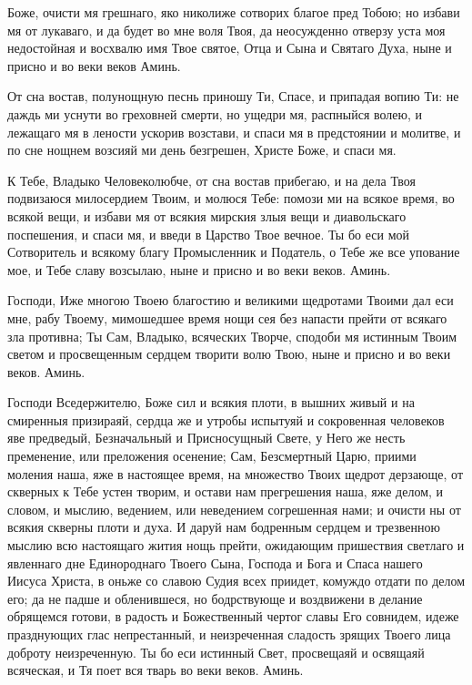 
Боже, очисти мя грешнаго, яко николиже сотворих благое пред Тобою; но избави мя от лукаваго, и да будет во мне воля Твоя, да неосужденно отверзу уста моя недостойная и восхвалю имя Твое святое, Отца и Сына и Святаго Духа, ныне и присно и во веки веков Аминь. 




От сна востав, полунощную песнь приношу Ти, Спасе, и припадая вопию Ти: не даждь ми уснути во греховней смерти, но ущедри мя, распныйся волею, и лежащаго мя в лености ускорив возстави, и спаси мя в предстоянии и молитве, и по сне нощнем возсияй ми день безгрешен, Христе Боже, и спаси мя.




К Тебе, Владыко Человеколюбче, от сна востав прибегаю, и на дела Твоя подвизаюся милосердием Твоим, и молюся Тебе: помози ми на всякое время, во всякой вещи, и избави мя от всякия мирския злыя вещи и диавольскаго поспешения, и спаси мя, и введи в Царство Твое вечное. Ты бо еси мой Сотворитель и всякому благу Промысленник и Податель, о Тебе же все упование мое, и Тебе славу возсылаю, ныне и присно и во веки веков. Аминь.




Господи, Иже многою Твоею благостию и великими щедротами Твоими дал еси мне, рабу Твоему, мимошедшее время нощи сея без напасти прейти от всякаго зла противна; Ты Сам, Владыко, всяческих Творче, сподоби мя истинным Твоим светом и просвещенным сердцем творити волю Твою, ныне и присно и во веки веков. Аминь.






Господи Вседержителю, Боже сил и всякия плоти, в вышних живый и на смиренныя призираяй, сердца же и утробы испытуяй и сокровенная человеков яве предведый, Безначальный и Присносущный Свете, у Него же несть пременение, или преложения осенение; Сам, Безсмертный Царю, приими моления наша, яже в настоящее время, на множество Твоих щедрот дерзающе, от скверных к Тебе устен творим, и остави нам прегрешения наша, яже делом, и словом, и мыслию, ведением, или неведением согрешенная нами; и очисти ны от всякия скверны плоти и духа. И даруй нам бодренным сердцем и трезвенною мыслию всю настоящаго жития нощь прейти, ожидающим пришествия светлаго и явленнаго дне Единороднаго Твоего Сына, Господа и Бога и Спаса нашего Иисуса Христа, в оньже со славою Судия всех приидет, комуждо отдати по делом его; да не падше и обленившеся, но бодрствующе и воздвижени в делание обрящемся готови, в радость и Божественный чертог славы Его совнидем, идеже празднующих глас непрестанный, и неизреченная сладость зрящих Твоего лица доброту неизреченную. Ты бо еси истинный Свет, просвещаяй и освящаяй всяческая, и Тя поет вся тварь во веки веков. Аминь. 


